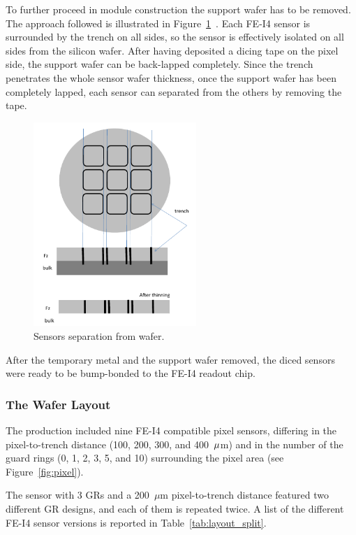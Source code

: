 To further proceed in module construction  the support wafer has to be removed. The approach followed is illustrated in Figure~\ref{fig:lapping}~\cite{Bomben:2013vua}. Each FE-I4 sensor is
surrounded by the trench on all sides, so  the sensor is effectively isolated  on all sides from the silicon wafer.
After having deposited a dicing tape on the pixel side, the support wafer can be back-lapped completely. Since the trench penetrates  the whole sensor wafer thickness,
once the support wafer has been completely lapped, each sensor can separated from the others by removing the tape.


\begin{figure}[!htpb]
\centering
\includegraphics[width=0.55\textwidth]{edgelesslapping.pdf}
\caption{Sensors separation from wafer.}
\label{fig:lapping}
\end{figure}


After the temporary metal and the support wafer removed, the diced sensors were ready to be 
bump-bonded to the FE-I4 readout chip.


\subsubsection{The Wafer Layout}
The production included nine FE-I4 compatible pixel sensors, differing in the pixel-to-trench distance (100, 200, 300, and 400~${\rm \mu}$m) and in the number of the guard rings (0, 1, 2, 3, 5, and 10)
surrounding the pixel area (see Figure~\ref{fig:pixel}).

The sensor with 3 GRs and a 200~$\mu$m pixel-to-trench distance featured two different GR designs, and
each of them is repeated twice.
A list of the different FE-I4 sensor versions is reported in Table~\ref{tab:layout_split}.


